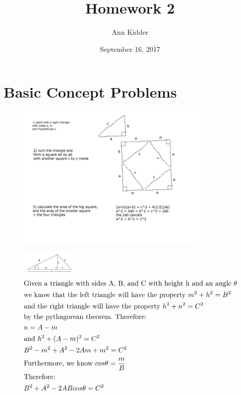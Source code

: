 \documentclass{article}%
\title{Homework 2}%
\author{Ann Kidder}%
\date{September 16, 2017}%
\begin{document}
%
\normalsize%
\maketitle%
\section{Basic Concept Problems}%


\begin{figure}[h!]%
\centering%
\includegraphics[width=350px]{pythagorean.jpg}%
\end{figure}

%


\begin{figure}[h!]%
\centering%
\includegraphics[width=100px]{triangle.jpg}%
\begin{alignat*}{2}%
&\textnormal{Given a triangle with sides A, B, and C }%
\textnormal{with height h and an angle } \theta\\%
& \textnormal{we know that the left triangle will}%
\textnormal{ have the property } m^2+h^2=B^2\\%
&\textnormal{and the right triangle will have the property }%
 h^2 + n^2 = C^2\\ &\textnormal{by the pythagorean theorem.}%
\textnormal{ Therefore:}\\%
&n = A - m\\%
&\textnormal{and } h^2 + (A-m)^2 = C^2\\%
&B^2-m^2+A^2-2Am+m^2 = C^2\\%
&\textnormal{Furthermore, we know } cos\theta = \frac{m}{B}\\%
&\textnormal{Therefore:}\\%
&B^2+A^2 -2ABcos\theta = C^2%
\end{alignat*}%
\end{figure}
\end{document}
